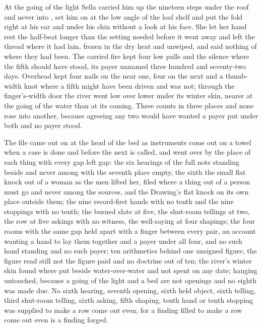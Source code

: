 At the going of the light Sella carried him up the nineteen steps under the roof and never into , set him on  at the low angle of the loaf shelf and put the fold right at his ear and under his chin without a look at his face. She let her hand rest the half-beat longer than the setting needed before it went away and left the thread where it had lain, frozen in the dry heat and unwiped, and said nothing of where they had been. The carried fire kept four low pulls and the silence where the fifth should have stood, its payer unnamed three hundred and seventy-two days. Overhead  kept four nails on the near one, four on the next and a thumb-width knot where a fifth might have been driven and was not; through the finger's-width door the river went low over lower under its winter skin, nearer at the going of the water than at its coming. Three counts in three places and none rose into another, because agreeing any two would have wanted a payer put under both and no payer stood.

The file came out on  at the head of the bed as instruments come out on a towel when a case is done and before the next is called, and went over by the place of each thing with every gap left gap: the six hearings of the full note standing beside and never among with the seventh place empty, the sixth the small flat knock out of a woman as the men lifted her, filed where a thing out of a person must go and never among the sources, and the Drawing's flat knock on its own place outside them; the nine record-first hands with no tenth and the nine stoppings with no tenth; the burned slate at five, the shut-room tellings at two, the row at five askings with no witness, the well-saying at four shapings; the four rooms with the same gap held apart with a finger between every pair, an account wanting a hand to lay them together and a payer under all four, and no such hand standing and no such payer; ten arithmetics behind one unsigned figure, the figure read still not the figure paid and no doctrine out of ten; the river's winter skin found where put beside water-over-water and not spent on any date;  hanging untouched, because a going of the light and a bed are not openings and no eighth was made due. No sixth hearing, seventh opening, sixth held object, sixth telling, third shut-room telling, sixth asking, fifth shaping, tenth hand or tenth stopping was supplied to make a row come out even, for a finding filled to make a row come out even is a finding forged.

